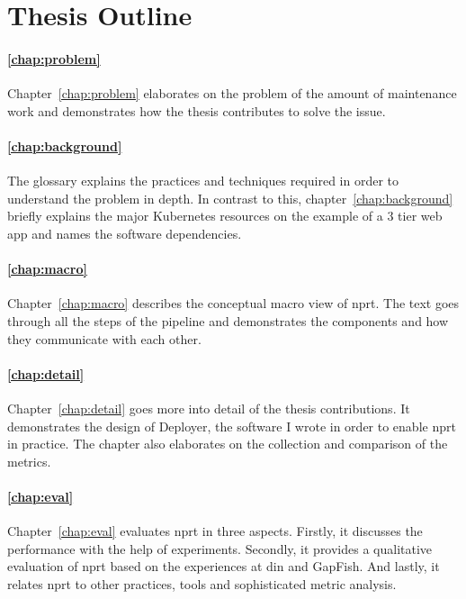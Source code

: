 \section{Thesis Outline}

\paragraph{\ref{chap:problem} }
Chapter~\ref{chap:problem} elaborates on the problem of the amount of maintenance work and
demonstrates how the thesis contributes to solve the issue.

\paragraph{\ref{chap:background} }
The glossary explains the practices and techniques required in order to understand the
problem in depth. In contrast to this, chapter~\ref{chap:background} briefly explains the
major Kubernetes resources on the example of a 3 tier web app and names the software
dependencies.

\paragraph{\ref{chap:macro} }
Chapter~\ref{chap:macro} describes the conceptual macro view of \gls{nprt}. The text goes
through all the steps of the pipeline and demonstrates the components and how they
communicate with each other.

\paragraph{\ref{chap:detail} }
Chapter~\ref{chap:detail} goes more into detail of the thesis contributions. It
demonstrates the design of Deployer, the software I wrote in order to enable \gls{nprt}
in practice. The chapter also elaborates on the collection and comparison of the metrics.

\paragraph{\ref{chap:eval} }
Chapter~\ref{chap:eval} evaluates \gls{nprt} in three aspects. Firstly, it discusses the
performance with the help of experiments. Secondly, it provides a qualitative evaluation
of \gls{nprt} based on the experiences at \gls{din} and GapFish. And lastly, it relates
\gls{nprt} to other practices, tools and sophisticated metric analysis.

